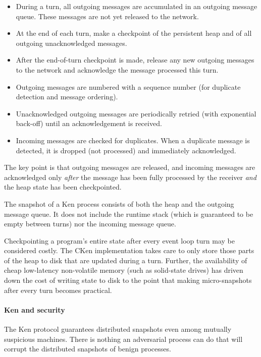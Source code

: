 \documentclass{llncs}
\begin{document}
\begin{itemize}
  \item During a turn, all outgoing messages are accumulated in an outgoing message queue. These messages are not yet released to the network.
  \item At the end of each turn, make a checkpoint of the persistent heap and of all outgoing unacknowledged messages.
  \item After the end-of-turn checkpoint is made, release any new outgoing messages to the network and acknowledge the message processed this turn.
  \item Outgoing messages are numbered with a sequence number (for duplicate detection and message ordering).
  \item Unacknowledged outgoing messages are periodically retried (with exponential back-off) until an acknowledgement is received.
  \item Incoming messages are checked for duplicates. When a duplicate message is detected, it is dropped (not processed) and immediately acknowledged.
\end{itemize}

The key point is that outgoing messages are released, and incoming messages are acknowledged only \emph{after} the message has been fully processed by the receiver \emph{and} the heap state has been checkpointed.

The snapshot of a Ken process consists of both the heap and the outgoing message queue. It does not include the runtime stack (which is guaranteed to be empty between turns) nor the incoming message queue.

Checkpointing a program's entire state after every event loop turn may be considered costly. The CKen implementation takes care to only store those parts of the heap to disk that are updated during a turn. Further, the availability of cheap low-latency non-volatile memory (such as solid-state drives) has driven down the cost of writing state to disk to the point that making micro-snapshots after every turn becomes practical.

\paragraph{Ken and security}

The Ken protocol guarantees distributed snapshots even among mutually suspicious machines. There is nothing an adversarial process can do that will corrupt the distributed snapshots of benign processes.
\end{document}
